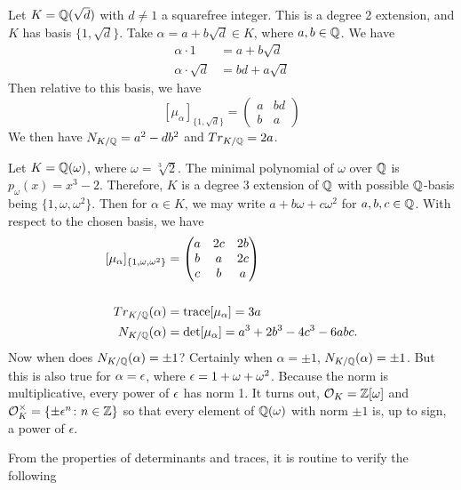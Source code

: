 \begin{ex} \label{ex:norm_trace_ex}
Let $K= \mathbb{Q}(\sqrt{d})$ with $d \neq 1$ a squarefree integer. This is a degree 2 extension, and $K$ has basis $\{ 1, \sqrt{d}\}$. Take $\alpha= a + b\sqrt{d} \in K$, where $a, b \in \mathbb{Q}$. We have
	\[
	\begin{split}
	\alpha \cdot 1&= a+b\sqrt{d} \\
	\alpha \cdot \sqrt{d}&= bd+a\sqrt{d}
	\end{split}
	\]
Then relative to this basis, we have
	\[
	[\mu_\alpha]_{\{1,\sqrt{d}\}}= \begin{pmatrix} a & bd \\ b & a \end{pmatrix}
	\]
We then have $N_{K/\mathbb{Q}}= a^2 - db^2$ and $Tr_{K/\mathbb{Q}}=2a$. \xqed
\end{ex}


\begin{ex} \label{ex:norm_trace_powerex}
Let $K= \mathbb{Q}(\omega)$, where $\omega= \sqrt[3]{2}$. The minimal polynomial of $\omega$ over $\mathbb{Q}$ is $p_\omega(x)= x^3 - 2$. Therefore, $K$ is a degree 3 extension of $\mathbb{Q}$ with possible $\mathbb{Q}$-basis being $\{ 1, \omega, \omega^2 \}$. Then for $\alpha \in K$, we may write $a + b\omega + c\omega^2$ for $a, b, c \in \mathbb{Q}$. With respect to the chosen basis, we have
	\[
	\begin{split}
	[\mu_\alpha]_{\{1,\omega, \omega^2\}}&= \begin{pmatrix} a & 2c & 2b \\ b & a & 2c \\ c & b & a \end{pmatrix} \\ \\
	Tr_{K/\mathbb{Q}}(\alpha)&= \operatorname{trace}[\mu_\alpha]= 3a \\
	N_{K/\mathbb{Q}}(\alpha)&= \det[\mu_\alpha]= a^3 + 2b^3 - 4c^3 - 6abc.
	\end{split}
	\]
Now when does $N_{K/\mathbb{Q}}(\alpha) =\pm 1$? Certainly when $\alpha= \pm 1$, $N_{K/\mathbb{Q}}(\alpha)= \pm 1$. But this is also true for $\alpha= \epsilon$, where $\epsilon= 1 + \omega + \omega^2$. Because the norm is multiplicative, every power of $\epsilon$ has norm 1. It turns out, $\mathcal{O}_K= \mathbb{Z}[\omega]$ and $\mathcal{O}_K^\times= \{ \pm \epsilon^n \colon n \in \mathbb{Z} \}$ so that every element of $\mathbb{Q}(\omega)$ with norm $\pm 1$ is, up to sign, a power of $\epsilon$. \xqed
\end{ex}


From the properties of determinants and traces, it is routine to verify the following


